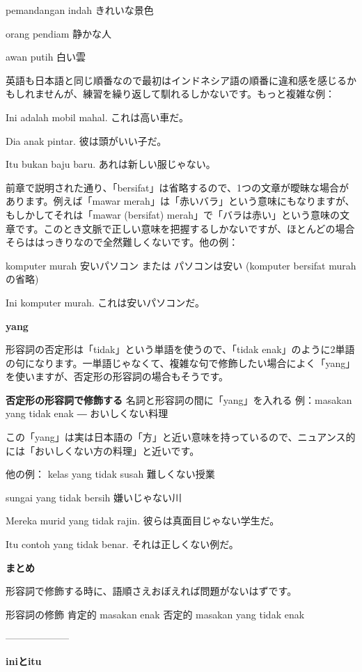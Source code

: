\documentclass[uplatex]{jsarticle}
\begin{document}
pemandangan indah
きれいな景色

orang pendiam
静かな人

awan putih
白い雲

英語も日本語と同じ順番なので最初はインドネシア語の順番に違和感を感じるかもしれませんが、練習を繰り返して馴れるしかないです。もっと複雑な例：

Ini adalah mobil mahal.
これは高い車だ。

Dia anak pintar.
彼は頭がいい子だ。

Itu bukan baju baru.
あれは新しい服じゃない。

前章で説明された通り、「bersifat」は省略するので、1つの文章が曖昧な場合があります。例えば「mawar merah」は「赤いバラ」という意味にもなりますが、もしかしてそれは「mawar (bersifat) merah」で「バラは赤い」という意味の文章です。このとき文脈で正しい意味を把握するしかないですが、ほとんどの場合そらははっきりなので全然難しくないです。他の例：

komputer murah
安いパソコン
または
パソコンは安い (komputer bersifat murahの省略)

Ini komputer murah.
これは安いパソコンだ。

\textbf{yang}

形容詞の否定形は「tidak」という単語を使うので、「tidak enak」のように2単語の句になります。一単語じゃなくて、複雑な句で修飾したい場合によく「yang」を使いますが、否定形の形容詞の場合もそうです。

\textbf{否定形の形容詞で修飾する}
名詞と形容詞の間に「yang」を入れる
例：masakan yang tidak enak ― おいしくない料理

この「yang」は実は日本語の「方」と近い意味を持っているので、ニュアンス的には「おいしくない方の料理」と近いです。

他の例：
kelas yang tidak susah
難しくない授業

sungai yang tidak bersih
嫌いじゃない川

Mereka murid yang tidak rajin.
彼らは真面目じゃない学生だ。

Itu contoh yang tidak benar.
それは正しくない例だ。

\textbf{まとめ}

形容詞で修飾する時に、語順さえおぼえれば問題がないはずです。

		形容詞の修飾
肯定的	masakan enak
否定的	masakan yang tidak enak

--------------------

\textbf{iniとitu}
\end{document}
